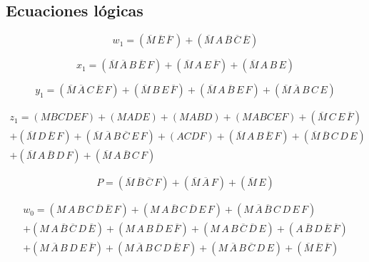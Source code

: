 \documentclass[12pt, oneside, openany]{article}
\begin{document}
\subsection{Ecuaciones lógicas }
{\sffamily
    \begin{equation*}
        w_1 = (\overline{M}\,\overline{E}\,\overline{F}\,) + (\overline{M}\,A\,\overline{B}\,\overline{C}\,\overline{E})
    \end{equation*}
    
    \begin{equation*}
        x_1 = (\overline{M}\,\overline{A}\,B\,\overline{E}\,F) + (\overline{M}\,A\,E\,\overline{F}) + (\overline{M}\,A\,B\,E)
    \end{equation*}
    
    \begin{equation*}
        y_1 = (\overline{M}\,\overline{A}\,C\,\overline{E}\,F) + (\overline{M}\,B\,E\,\overline{F}) + (\overline{M}\,A\,\overline{B}\,E\,F) + (\overline{M}\,\overline{A}\,B\,C\,E)
    \end{equation*}
    
    \begin{multline*}
        z_1 = (MBCDEF) + (MADE) + (MABD) + (MABCEF) + (\overline{M}\,C\,E\,\overline{F}) \\
        + (\overline{M}\,D\,\overline{E}\,F) + (\overline{M}\,\overline{A}\,B\,\overline{C}\,E\,F) + (ACDF) + (\overline{M}\,A\,B\,\overline{E}\,F) + (\overline{M}\,\overline{B}\,C\,D\,E) \\
        + (\overline{M}\,A\,\overline{B}\,D\,F) + (\overline{M}\,A\,\overline{B}\,C\,F)
    \end{multline*}
    
    \begin{equation*}
        P = (\overline{M}\,\overline{B}\,\overline{C}\,F) + (\overline{M}\,\overline{A}\,F) + (\overline{M}\,E)
    \end{equation*}
    
    \begin{multline*}
        w_0 = (M\,A\,B\,C\,\overline{D}\,\overline{E}\,F) + (M\,A\,\overline{B}\,C\,\overline{D}\,E\,F) + (M\,\overline{A}\,\overline{B}\,C\,D\,E\,F) \\
        + (M\,A\,\overline{B}\,\overline{C}\,D\,\overline{E}) + (M\,A\,B\,\overline{D}\,E\,\overline{F}) + (M\,A\,B\,\overline{C}\,\overline{D}\,E) + (A\,\overline{B}\,D\,\overline{E}\,\overline{F}) \\
        + (M\,\overline{A}\,B\,D\,E\,\overline{F}) + (M\,\overline{A}\,B\,C\,D\,\overline{E}\,F) + (M\,\overline{A}\,B\,\overline{C}\,D\,E) + (\overline{M}\,\overline{E}\,\overline{F})
    \end{multline*}
    
}
\end{document}

